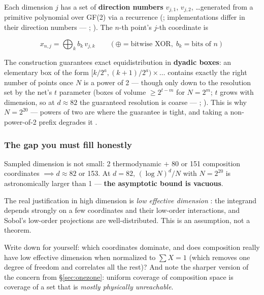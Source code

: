 Each dimension $j$ has a set of \textbf{direction numbers} $v_{j,1}$, $v_{j,2}$,
\ldots generated from a primitive polynomial over GF(2) via a recurrence
(\citealt{sobol1967}; implementations differ in their direction numbers ---
\citealt{bratley1988}; \citealt{joe2008}). The $n$-th point's $j$-th coordinate
is

\begin{equation*}
x_{n,j} = \bigoplus_k b_k\,v_{j,k} \qquad
(\oplus = \text{bitwise XOR},\; b_k = \text{bits of } n)
\end{equation*}

The construction guarantees exact equidistribution in \textbf{dyadic boxes}: an
elementary box of the form $[k/2^a, (k+1)/2^a) \times \ldots$ contains exactly
the right number of points once $N$ is a power of 2 --- though only down to the
resolution set by the net's $t$ parameter (boxes of volume $\geq 2^{t-m}$ for
$N = 2^m$; $t$ grows with dimension, so at $d \approx 82$ the guaranteed
resolution is coarse --- \citealt{niederreiter1992}; \citealt{owen2022}). This
is why \textbf{$N = 2^{20}$} --- powers of two are where the guarantee is tight,
and taking a non-power-of-2 prefix degrades it \citep{owen2022}.

\subsubsection{The gap you must fill honestly}
\label{sec:sobolgap}

\begin{warn}
Sampled dimension is not small: 2 thermodynamic $+$ 80 or 151 composition
coordinates $\implies d \approx 82$ or 153. At $d = 82$, $(\log N)^d/N$ with
$N = 2^{20}$ is astronomically larger than 1 --- \textbf{the asymptotic bound is
vacuous}.
\end{warn}

The real justification in high dimension is \emph{low effective dimension}
\citep{caflisch1997}: the integrand depends strongly on a few coordinates and
their low-order interactions, and Sobol's low-order projections are
well-distributed. This is an assumption, not a theorem.

Write down for yourself: which coordinates dominate, and does composition really
have low effective dimension when normalized to $\sum X = 1$ (which removes one
degree of freedom and correlates all the rest)? And note the sharper version of
the concern from \S\ref{sec:onezone}: uniform coverage of composition space is
coverage of a set that is \emph{mostly physically unreachable}.

